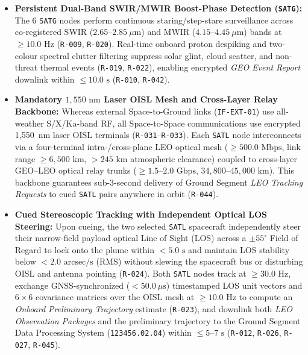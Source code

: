 \documentclass[11pt,a4paper]{article}
\providecommand{\abbr}[1]{#1}
\begin{document}
\begin{itemize}
    \item \textbf{Persistent Dual-Band \abbr{SWIR}/\abbr{MWIR} Boost-Phase Detection (\texttt{SATG}):} The 6 \texttt{SATG} nodes perform continuous staring/step-stare surveillance across co-registered \abbr{SWIR} ($2.65\text{--}2.85~\mu\mathrm{m}$) and \abbr{MWIR} ($4.15\text{--}4.45~\mu\mathrm{m}$) bands at $\ge 10.0\text{ Hz}$ (\texttt{R-009}, \texttt{R-020}). Real-time onboard proton despiking and two-colour spectral clutter filtering suppress solar glint, cloud scatter, and non-threat thermal events (\texttt{R-019}, \texttt{R-022}), enabling encrypted \emph{GEO Event Report} downlink within $\le 10.0\text{ s}$ (\texttt{R-010}, \texttt{R-042}).
    \item \textbf{Mandatory $1{,}550\text{ nm}$ Laser \abbr{OISL} Mesh and Cross-Layer Relay Backbone:} Whereas external Space-to-Ground links (\texttt{IF-EXT-01}) use all-weather S/X/Ka-band \abbr{RF}, all Space-to-Space communications use encrypted 1,550~nm laser \abbr{OISL} terminals (\texttt{R-031}--\texttt{R-033}). Each \texttt{SATL} node interconnects via a four-terminal intra-/cross-plane \abbr{LEO} optical mesh ($\ge 500.0\text{ Mbps}$, link range $\ge 6{,}500\text{ km}$, $> 245\text{ km}$ atmospheric clearance) coupled to cross-layer \abbr{GEO}--\abbr{LEO} optical relay trunks ($\ge 1.5\text{--}2.0\text{ Gbps}$, $34{,}800\text{--}45{,}000\text{ km}$). This backbone guarantees sub-3-second delivery of Ground Segment \emph{LEO Tracking Requests} to cued \texttt{SATL} pairs anywhere in orbit (\texttt{R-044}).
    \item \textbf{Cued Stereoscopic Tracking with Independent Optical \abbr{LOS} Steering:} Upon cueing, the two selected \texttt{SATL} spacecraft independently steer their narrow-field payload optical Line of Sight (\abbr{LOS}) across a $\pm 55^\circ$ Field of Regard to lock onto the plume within $< 5.0\text{ s}$ and maintain \abbr{LOS} stability below $< 2.0\text{ arcsec/s}$ (RMS) without slewing the spacecraft bus or disturbing \abbr{OISL} and antenna pointing (\texttt{R-024}). Both \texttt{SATL} nodes track at $\ge 30.0\text{ Hz}$, exchange GNSS-synchronized ($< 50.0~\mu\mathrm{s}$) timestamped \abbr{LOS} unit vectors and $6 \times 6$ covariance matrices over the \abbr{OISL} mesh at $\ge 10.0\text{ Hz}$ to compute an \emph{Onboard Preliminary Trajectory} estimate (\texttt{R-023}), and downlink both \emph{LEO Observation Packages} and the preliminary trajectory to the Ground Segment Data Processing System (\texttt{123456.02.04}) within $\le 5\text{--}7\text{ s}$ (\texttt{R-012}, \texttt{R-026}, \texttt{R-027}, \texttt{R-045}).

\end{itemize}
\end{document}
